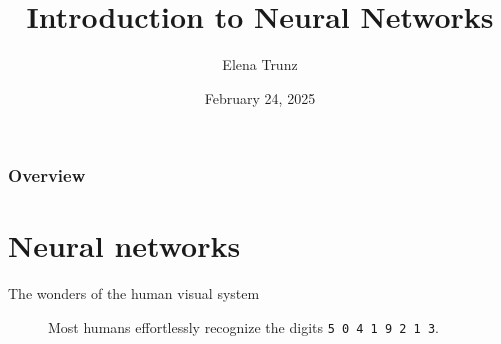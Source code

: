 \documentclass{beamer}
\title{Introduction to Neural Networks}
\date{February 24, 2025}%
\institute{Visual Computing Group, University of Bonn}
\author{Elena Trunz}
\begin{document}
    \maketitle

    \begin{frame}
    \frametitle{Overview} 
    \tableofcontents
    \end{frame}

    \section{Neural networks}
    \begin{frame}{The wonders of the human visual system}
      \begin{figure}
        
        \caption{Most humans effortlessly recognize the digits \texttt{5 0 4 1 9 2 1 3}.}
      \end{figure}
    \end{frame}
\end{document}
